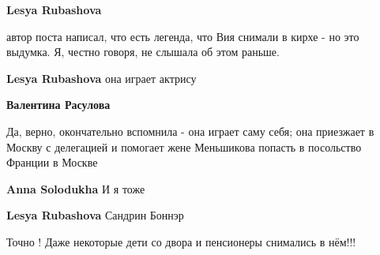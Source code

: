 \begin{itemize}
\begin{itemize}
\textbf{Lesya Rubashova} 

автор поста написал, что есть легенда, что Вия снимали в кирхе - но это
выдумка. Я, честно говоря, не слышала об этом раньше.

\textbf{Lesya Rubashova} она играет актрису

\textbf{Валентина Расулова} 

Да, верно, окончательно вспомнила - она играет саму себя; она приезжает в
Москву с делегацией и помогает жене Меньшикова попасть в посольство Франции в
Москве


\textbf{Anna Solodukha} И я тоже

\textbf{Lesya Rubashova} Сандрин Боннэр

\end{itemize} %

\end{itemize} %


Точно ! Даже некоторые дети со двора и пенсионеры снимались в нём!!!
